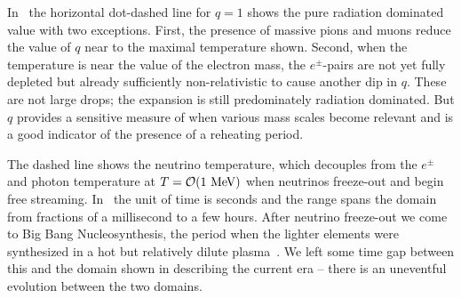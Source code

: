  In~ the horizontal dot-dashed line for $q=1$ shows the pure radiation dominated value with two exceptions. First, the presence of massive pions and muons reduce the value of $q$ near to the maximal temperature shown. Second, when the temperature is near the value of the electron mass, the $e^\pm$-pairs are not yet fully depleted but already sufficiently non-relativistic to cause another dip in $q$. These are not large drops; the expansion is still predominately radiation dominated. But $q$ provides a sensitive measure of when various mass scales become relevant and is a good indicator of the presence of a reheating period.

 The dashed line shows the neutrino temperature, which decouples from the $e^\pm$ and photon temperature at $T={\cal O}(1\MeV)$ when neutrinos freeze-out and begin free streaming. In~ the unit of time is seconds and the range spans the domain from fractions of a millisecond to a few hours. After neutrino freeze-out we come to Big Bang Nucleosynthesis, the period when the lighter elements were synthesized in a hot but relatively dilute plasma~\cite{Iocco:2008va}. We left some time gap between this and the domain shown in  describing the current era -- there is an uneventful evolution between the two domains. 
 